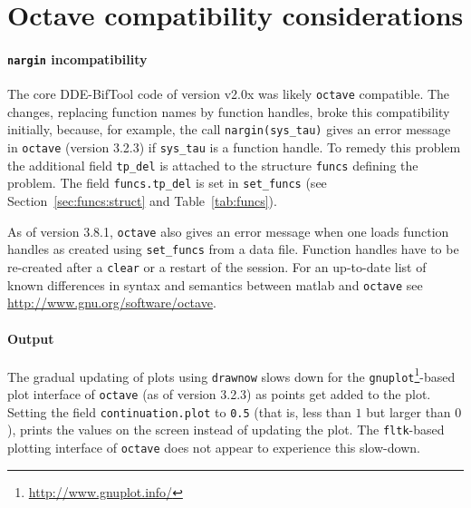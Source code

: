 \documentclass[10pt]{scrartcl}
\newcommand{\blist}[1]{\mbox{\lstinline!#1!}}
\begin{document}
{%


\section{Octave compatibility  considerations}
\label{sec:octave}
\paragraph{\blist{nargin} incompatibility} The core DDE-BifTool code
of version v2.0x was likely \texttt{octave} compatible. The changes,
replacing function names by function handles, broke this compatibility
initially, because, for example, the call \blist{nargin(sys_tau)}
gives an error message in \texttt{octave} (version 3.2.3) if
\blist{sys_tau} is a function handle. To remedy this problem the
additional field \blist{tp_del} is attached to the structure
\blist{funcs} defining the problem. The field \blist{funcs.tp_del} is
set in \blist{set_funcs} (see Section~\ref{sec:funcs:struct} and
Table~\ref{tab:funcs}).

As of version 3.8.1, \texttt{octave} also gives an error message when
one loads function handles as created using \blist{set_funcs} from a
data file. Function handles have to be re-created after a
\blist{clear} or a restart of the session. For an up-to-date list of
known differences in syntax and semantics between matlab and
\texttt{octave} see \url{http://www.gnu.org/software/octave}.
\paragraph{Output} The gradual updating of plots using \blist{drawnow}
slows down for the
\texttt{gnuplot}\footnote{\url{http://www.gnuplot.info/}}-based plot
interface of \texttt{octave} (as of version 3.2.3) as points get added
to the plot. Setting the field \blist{continuation.plot} to
\blist{0.5} (that is, less than $1$ but larger than $0$), prints the
values on the screen instead of updating the plot. The
\texttt{fltk}-based plotting interface of \texttt{octave} does not
appear to experience this slow-down.

}
\end{document}
